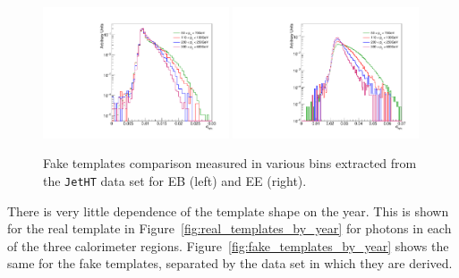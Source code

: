 \begin{figure}[!htbp]
\centering
\includegraphics[width=0.49\textwidth]{fig/faketemplatecompEB_jetht_2018.pdf}
\includegraphics[width=0.49\textwidth]{fig/faketemplatecompEE_jetht_2018.pdf}
\caption{Fake templates comparison measured in various \pt bins extracted from the \texttt{JetHT} data set for EB (left) and EE (right).}
\label{fig:fake_templates}
\end{figure}

There is very little dependence of the template shape on the year. This is shown for the real template in Figure~\ref{fig:real_templates_by_year} for photons in each of the three calorimeter regions. Figure~\ref{fig:fake_templates_by_year} shows the same for the fake templates, separated by the data set in which they are derived. 

